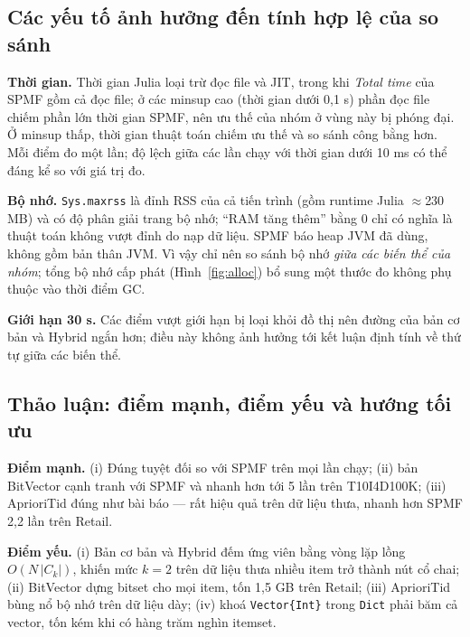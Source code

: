 \documentclass[10pt,twocolumn,letterpaper]{article}
\begin{document}
\subsection{Các yếu tố ảnh hưởng đến tính hợp lệ của so sánh}
\textbf{Thời gian.} Thời gian Julia loại trừ đọc file và JIT, trong khi \emph{Total time} của SPMF gồm cả đọc file; ở các minsup cao (thời gian dưới 0,1 s) phần đọc file chiếm phần lớn thời gian SPMF, nên ưu thế của nhóm ở vùng này bị phóng đại. Ở minsup thấp, thời gian thuật toán chiếm ưu thế và so sánh công bằng hơn. Mỗi điểm đo một lần; độ lệch giữa các lần chạy với thời gian dưới 10 ms có thể đáng kể so với giá trị đo.

\textbf{Bộ nhớ.} \texttt{Sys.maxrss} là đỉnh RSS của cả tiến trình (gồm runtime Julia $\approx$230 MB) và có độ phân giải trang bộ nhớ; ``RAM tăng thêm'' bằng 0 chỉ có nghĩa là thuật toán không vượt đỉnh do nạp dữ liệu. SPMF báo heap JVM đã dùng, không gồm bản thân JVM. Vì vậy chỉ nên so sánh bộ nhớ \emph{giữa các biến thể của nhóm}; tổng bộ nhớ cấp phát (Hình~\ref{fig:alloc}) bổ sung một thước đo không phụ thuộc vào thời điểm GC.

\textbf{Giới hạn 30 s.} Các điểm vượt giới hạn bị loại khỏi đồ thị nên đường của bản cơ bản và Hybrid ngắn hơn; điều này không ảnh hưởng tới kết luận định tính về thứ tự giữa các biến thể.

\subsection{Thảo luận: điểm mạnh, điểm yếu và hướng tối ưu}\label{sec:discuss}
\textbf{Điểm mạnh.} (i) Đúng tuyệt đối so với SPMF trên mọi lần chạy; (ii) bản BitVector cạnh tranh với SPMF và nhanh hơn tới 5 lần trên T10I4D100K; (iii) AprioriTid đúng như bài báo — rất hiệu quả trên dữ liệu thưa, nhanh hơn SPMF 2,2 lần trên Retail.

\textbf{Điểm yếu.} (i) Bản cơ bản và Hybrid đếm ứng viên bằng vòng lặp lồng $O(N\,|C_k|)$, khiến mức $k=2$ trên dữ liệu thưa nhiều item trở thành nút cổ chai; (ii) BitVector dựng bitset cho mọi item, tốn 1,5 GB trên Retail; (iii) AprioriTid bùng nổ bộ nhớ trên dữ liệu dày; (iv) khoá \texttt{Vector\{Int\}} trong \texttt{Dict} phải băm cả vector, tốn kém khi có hàng trăm nghìn itemset.
\end{document}
